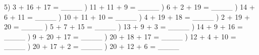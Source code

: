 \documentclass{article}%
\begin{document}
5) 3 + 16 + 17 = \_\_\_\_%
\newline%
\newline%
) 11 + 11 + 9 = \_\_\_\_%
\newline%
\newline%
) 6 + 2 + 19 = \_\_\_\_%
\newline%
\newline%
) 14 + 6 + 11 = \_\_\_\_%
\newline%
\newline%
) 10 + 11 + 10 = \_\_\_\_%
\newline%
\newline%
) 4 + 19 + 18 = \_\_\_\_%
\newline%
\newline%
) 2 + 19 + 20 = \_\_\_\_%
\newline%
\newline%
) 5 + 7 + 15 = \_\_\_\_%
\newline%
\newline%
) 13 + 9 + 3 = \_\_\_\_%
\newline%
\newline%
) 14 + 9 + 16 = \_\_\_\_%
\newline%
\newline%
) 9 + 20 + 17 = \_\_\_\_%
\newline%
\newline%
) 20 + 18 + 17 = \_\_\_\_%
\newline%
\newline%
) 12 + 4 + 10 = \_\_\_\_%
\newline%
\newline%
) 20 + 17 + 2 = \_\_\_\_%
\newline%
\newline%
) 20 + 12 + 6 = \_\_\_\_%
\newline%
\newline%
\end{document}
